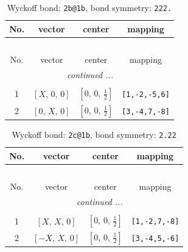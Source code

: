 \documentclass[fleqn,8pt]{jsarticle}
\begin{document}
\renewcommand{\arraystretch}{1.2}
\begin{longtable}{cccc}
\caption{Wyckoff bond: {\tt 2b@1b}, bond symmetry: {\tt 222.}}
 \\
 \hline \hline
No. & vector & center & mapping \\ \hline \endfirsthead

\multicolumn{3}{l}{\tablename\ \thetable{}} \\
 \hline \hline
No. & vector & center & mapping \\ \hline \endhead

 \hline \hline
\multicolumn{3}{r}{\footnotesize\it continued ...} \\ \endfoot

 \hline \hline
\multicolumn{3}{r}{} \\ \endlastfoot

1 & $\left[ X,\, 0,\, 0 \right]$ & $\left[ 0,\, 0,\, \frac{1}{2} \right]$ & {\tt [1,-2,-5,6]} \\ \hline
2 & $\left[ 0,\, X,\, 0 \right]$ & $\left[ 0,\, 0,\, \frac{1}{2} \right]$ & {\tt [3,-4,7,-8]} \\
\end{longtable}
\renewcommand{\arraystretch}{1.2}
\begin{longtable}{cccc}
\caption{Wyckoff bond: {\tt 2c@1b}, bond symmetry: {\tt 2.22}}
 \\
 \hline \hline
No. & vector & center & mapping \\ \hline \endfirsthead

\multicolumn{3}{l}{\tablename\ \thetable{}} \\
 \hline \hline
No. & vector & center & mapping \\ \hline \endhead

 \hline \hline
\multicolumn{3}{r}{\footnotesize\it continued ...} \\ \endfoot

 \hline \hline
\multicolumn{3}{r}{} \\ \endlastfoot

1 & $\left[ X,\, X,\, 0 \right]$ & $\left[ 0,\, 0,\, \frac{1}{2} \right]$ & {\tt [1,-2,7,-8]} \\ \hline
2 & $\left[ - X,\, X,\, 0 \right]$ & $\left[ 0,\, 0,\, \frac{1}{2} \right]$ & {\tt [3,-4,5,-6]} \\
\end{longtable}
\renewcommand{\arraystretch}{1.2}
\end{document}
